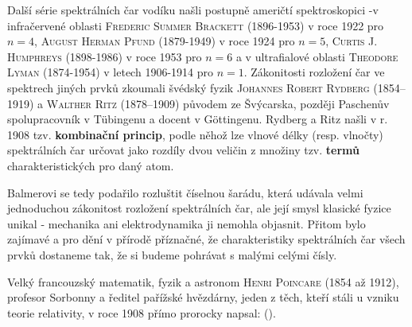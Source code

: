         
        Další série spektrálních čar vodíku našli postupně američtí spektroskopici -v infračervené
        oblasti \textsc{Frederic Summer Brackett} (1896-1953) v roce 1922 pro \(n = 4\),
        \textsc{August Herman Pfund} (1879-1949) v roce 1924 pro \(n = 5\), \textsc{Curtis J.
        Humphreys} (1898-1986) v roce 1953 pro \(n = 6\) a v ultrafialové oblasti \textsc{Theodore
        Lyman} (1874-1954) v letech 1906-1914 pro \(n =1\). Zákonitosti rozložení čar ve spektrech
        jiných prvků zkoumali švédský fyzik \textsc{Johannes Robert Rydberg} (1854–1919) a
        \textsc{Walther Ritz} (1878–1909) původem ze Švýcarska, později Paschenův spolupracovník v
        Tübingenu a docent v Göttingenu. Rydberg a Ritz našli v r. 1908 tzv. \textbf{kombinační
        princip}, podle něhož lze vlnové délky (resp. vlnočty) spektrálních čar určovat jako rozdíly
        dvou veličin z množiny tzv. \textbf{termů} charakteristických pro daný atom.

        Balmerovi se tedy podařilo rozluštit číselnou šarádu, která udávala velmi jednoduchou
        zákonitost rozložení spektrálních čar, ale její smysl klasické fyzice unikal - mechanika ani
        elektrodynamika ji nemohla objasnit. Přitom bylo zajímavé a pro dění v přírodě příznačné, že
        charakteristiky spektrálních čar všech prvků dostaneme tak, že si budeme pohrávat s malými
        celými čísly.
      
      Velký francouzský matematik, fyzik a astronom \textsc{Henri Poincare} (1854 až 1912), profesor
      Sorbonny a ředitel pařížské hvězdárny, jeden z těch, kteří stáli u vzniku teorie relativity, v
      roce 1908 přímo prorocky napsal: \emph{} ().

